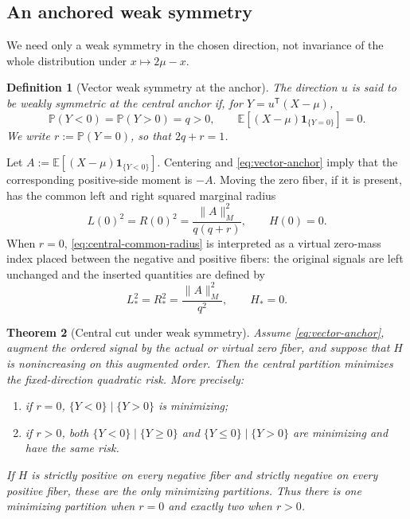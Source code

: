 \documentclass[a4paper]{amsart}
\numberwithin{equation}{section}
\newtheorem{theorem}{Theorem}[section]
\newtheorem{definition}[theorem]{Definition}
\theoremstyle{remark}
\newcommand{\1}{\mathbf 1}
\begin{document}
\subsection{An anchored weak symmetry}
\label{subsec:anchored-vector-symmetry}

We need only a weak symmetry in the chosen direction, not invariance of the
whole distribution under $x\mapsto2\mu-x$.

\begin{definition}[Vector weak symmetry at the anchor]
\label{def:vector-weak-symmetry}
The direction $u$ is said to be weakly symmetric at the central anchor if,
for $Y=u^{\mathsf T}(X-\mu)$,
\begin{equation}\label{eq:vector-anchor}
  \mathbb P(Y<0)=\mathbb P(Y>0)=q>0,
  \qquad
  \mathbb E[(X-\mu)\mathbf 1_{\{Y=0\}}]=0.
\end{equation}
We write $r:=\mathbb P(Y=0)$, so that $2q+r=1$.
\end{definition}

Let
$A:=\mathbb E[(X-\mu)\mathbf 1_{\{Y<0\}}]$.  Centering and
\eqref{eq:vector-anchor} imply that the corresponding positive-side
moment is $-A$.  Moving the zero fiber, if it is present, has the common
left and right squared marginal radius
\begin{equation}\label{eq:central-common-radius}
  L(0)^2=R(0)^2
  =\frac{\|A\|_M^2}{q(q+r)},
  \qquad H(0)=0.
\end{equation}
When $r=0$, \eqref{eq:central-common-radius} is interpreted as a virtual
zero-mass index placed between the negative and positive fibers: the original
signals are left unchanged and the inserted quantities are defined by
\[
 L_*^2=R_*^2=\frac{\|A\|_M^2}{q^2},\qquad H_*=0.
\]

\begin{theorem}[Central cut under weak symmetry]
\label{thm:anchored-vector-cut}
Assume \eqref{eq:vector-anchor}, augment the ordered signal by the actual
or virtual zero fiber, and suppose that $H$ is nonincreasing on this
augmented order.  Then the central partition minimizes the fixed-direction
quadratic risk.  More precisely:
\begin{enumerate}
\item if $r=0$, $\{Y<0\}\mid\{Y>0\}$ is minimizing;
\item if $r>0$, both
$\{Y<0\}\mid\{Y\geq0\}$ and
$\{Y\leq0\}\mid\{Y>0\}$ are minimizing and have the same risk.
\end{enumerate}
If $H$ is strictly positive on every negative fiber and strictly negative
on every positive fiber, these are the only minimizing partitions.  Thus
there is one minimizing partition when $r=0$ and exactly two when $r>0$.
\end{theorem}
\end{document}
